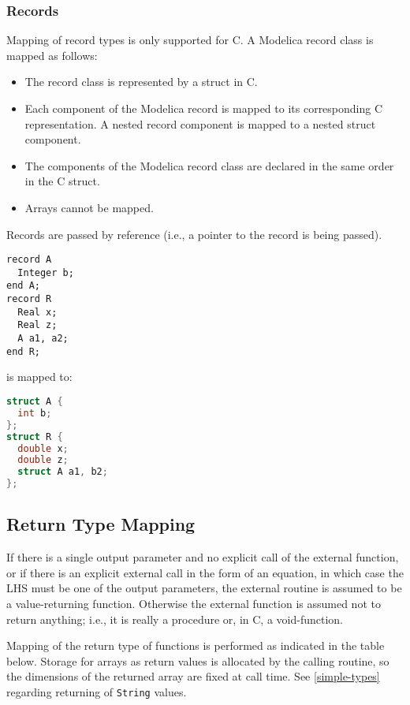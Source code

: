 \subsubsection{Records}\label{records}

Mapping of record types is only supported for C.
A Modelica record class is mapped as follows:
\begin{itemize}
\item
  The record class is represented by a struct in C.
\item
  Each component of the Modelica record is mapped to its corresponding C representation.
  A nested record component is mapped to a nested struct component.
\item
  The components of the Modelica record class are declared in the same order in the C struct.
\item
  Arrays cannot be mapped.
\end{itemize}

Records are passed by reference (i.e., a pointer to the record is being passed).

\begin{example}
\begin{lstlisting}[language=modelica]
record A
  Integer b;
end A;
record R
  Real x;
  Real z;
  A a1, a2;
end R;
\end{lstlisting}
is mapped to:
\begin{lstlisting}[language=C]
struct A {
  int b;
};
struct R {
  double x;
  double z;
  struct A a1, b2;
};
\end{lstlisting}
\end{example}

\subsection{Return Type Mapping}\label{return-type-mapping}

If there is a single output parameter and no explicit call of the external function, or if there is an explicit external call in the form of an equation, in which case the LHS must be one of the output parameters, the external routine is assumed to be a value-returning function.
Otherwise the external function is assumed not to return anything; i.e., it is really a procedure or, in C, a void-function.

Mapping of the return type of functions is performed as indicated in the table below.
Storage for arrays as return values is allocated by the calling routine, so the dimensions of the returned array are fixed at call time.
See \cref{simple-types} regarding returning of {\lstinline!String!} values.

